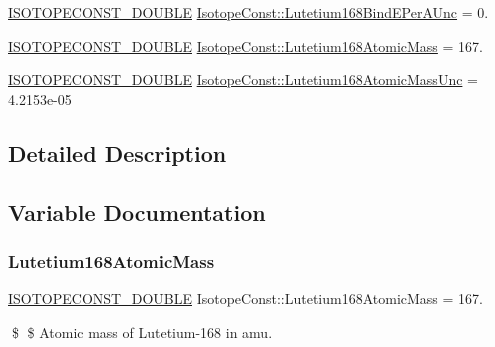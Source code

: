 \begin{DoxyCompactItemize}
\mbox{\hyperlink{group___isotope_const-_macros_ga8f45a7272ce02c0b4c65c44636ed719a}{I\+S\+O\+T\+O\+P\+E\+C\+O\+N\+S\+T\+\_\+\+D\+O\+U\+B\+LE}} \mbox{\hyperlink{group___isotope_const-_lutetium-_lu168_gabfd085a999f9b79c63c2305fb6c4d1a7}{Isotope\+Const\+::\+Lutetium168\+Bind\+E\+Per\+A\+Unc}} = 0.
\item 
\mbox{\hyperlink{group___isotope_const-_macros_ga8f45a7272ce02c0b4c65c44636ed719a}{I\+S\+O\+T\+O\+P\+E\+C\+O\+N\+S\+T\+\_\+\+D\+O\+U\+B\+LE}} \mbox{\hyperlink{group___isotope_const-_lutetium-_lu168_ga98a5bb43f7318864de5ecffe3810e5b2}{Isotope\+Const\+::\+Lutetium168\+Atomic\+Mass}} = 167.
\item 
\mbox{\hyperlink{group___isotope_const-_macros_ga8f45a7272ce02c0b4c65c44636ed719a}{I\+S\+O\+T\+O\+P\+E\+C\+O\+N\+S\+T\+\_\+\+D\+O\+U\+B\+LE}} \mbox{\hyperlink{group___isotope_const-_lutetium-_lu168_gae425e04f35eab2ff650c5f78ca670515}{Isotope\+Const\+::\+Lutetium168\+Atomic\+Mass\+Unc}} = 4.\+2153e-\/05
\end{DoxyCompactItemize}


\subsection{Detailed Description}


\subsection{Variable Documentation}
\mbox{\label{group___isotope_const-_lutetium-_lu168_ga98a5bb43f7318864de5ecffe3810e5b2}} 
\subsubsection{\texorpdfstring{Lutetium168\+Atomic\+Mass}{Lutetium168AtomicMass}}
{\footnotesize\ttfamily \mbox{\hyperlink{group___isotope_const-_macros_ga8f45a7272ce02c0b4c65c44636ed719a}{I\+S\+O\+T\+O\+P\+E\+C\+O\+N\+S\+T\+\_\+\+D\+O\+U\+B\+LE}} Isotope\+Const\+::\+Lutetium168\+Atomic\+Mass = 167.}

\$ \$ Atomic mass of Lutetium-\/168 in amu. \mbox{\label{group___isotope_const-_lutetium-_lu168_gae425e04f35eab2ff650c5f78ca670515}} 
